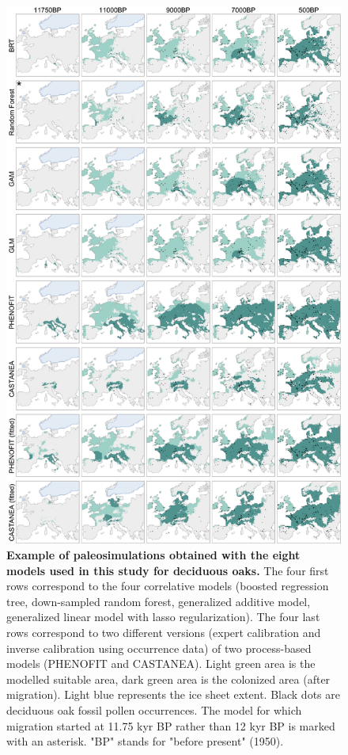 \documentclass[pdflatex, sn-nature]{sn-jnl}%
\begin{document}
\begin{figure}
\centering
\vspace*{-0.6in}
\hspace*{-0.35in}
\includegraphics[scale=0.95]{quercus_deciduous_simulations.pdf}
\caption{\textbf{Example of paleosimulations obtained with the eight models used in this study for deciduous oaks.} The four first rows correspond to the four correlative models (boosted regression tree, down-sampled random forest, generalized additive model, generalized linear model with lasso regularization). The four last rows correspond to two different versions (expert calibration and inverse calibration using occurrence data) of two process-based models (PHENOFIT and CASTANEA). Light green area is the modelled suitable area, dark green area is the colonized area (after migration). Light blue represents the ice sheet extent. Black dots are deciduous oak fossil pollen occurrences. The model for which migration started at 11.75 kyr BP rather than 12 kyr BP is marked with an asterisk. "BP" stands for "before present" (1950).}\label{quercus_migration}
\end{figure}
\end{document}
